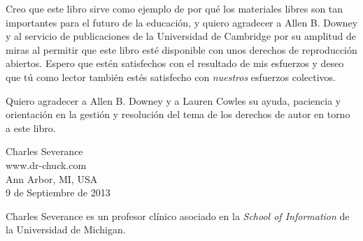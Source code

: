 Creo que este libro sirve como ejemplo de por qué los materiales libres
son tan importantes para el futuro de la educación,
y quiero agradecer a Allen B. Downey y al servicio de publicaciones de
la Universidad de Cambridge por su amplitud de miras al permitir
que este libro esté disponible con unos derechos de reproducción abiertos.
Espero que estén satisfechos con el resultado de mis esfuerzos y deseo
que tú como lector también estés satisfecho con \emph{nuestros}
esfuerzos colectivos.

Quiero agradecer a Allen B. Downey y a Lauren Cowles su ayuda,
paciencia y orientación en la gestión y resolución del tema
de los derechos de autor en torno a este libro.

Charles Severance\\
www.dr-chuck.com\\
Ann Arbor, MI, USA\\
9 de Septiembre de 2013

Charles Severance es un
profesor clínico asociado
en la \emph{School of Information} de la Universidad de Michigan.

\clearemptydoublepage

\begin{latexonly}

\tableofcontents

\clearemptydoublepage

\end{latexonly}

\mainmatter

